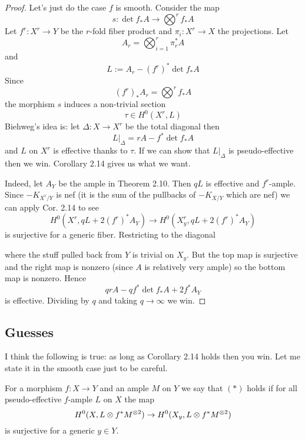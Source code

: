 \documentclass[12pt]{article}
\begin{document}
\begin{proof}
Let's just do the case $f$ is smooth. Consider the map
\[ s : \det{f_* A} \to \bigotimes^r f_* A \]
Let $f^r : X^r \to Y$ be the $r$-fold fiber product and $\pi_i : X^r \to X$ the projections. Let
\[ A_r = \bigotimes_{i = 1}^r \pi_r^* A \]
and 
\[ L := A_r - (f^r)^* \det{f_* A} \]
Since 
\[ (f^r)_* A_r = \bigotimes^r f_* A \]
the morphism $s$ induces a non-trivial section
\[ \tau \in H^0(X^r, L) \]
Biehweg's idea is: let $\Delta : X \to X^r$ be the total diagonal then
\[ L|_\Delta = r A - f^* \det{f_* A} \]
and $L$ on $X^r$ is effective thanks to $\tau$. If we can show that $L|_\Delta$ is pseudo-effective then we win. Corollary 2.14 gives us what we want.
\par 
Indeed, let $A_Y$ be the ample in Theorem 2.10. Then  $qL$ is effective and $f^r$-ample. Since $-K_{X^r/Y}$ is nef (it is the sum of the pullbacks of $-K_{X/Y}$ which are nef) we can apply Cor. 2.14 to see 
\[ H^0(X^r, q L + 2 (f^r)^* A_Y) \to H^0(X_y^r, q L + 2 (f^r)^* A_Y) \]
is surjective for a generic fiber. Restricting to the diagonal
\begin{center}
\end{center}
where the stuff pulled back from $Y$ is trivial on $X_y$. But the top map is surjective and the right map is nonzero (since $A$ is relatively very ample) so the bottom map is nonzero. Hence
\[ qr A - q f^* \det{f_* A} + 2 f^* A_Y \]
is effective. Dividing by $q$ and taking $q \to \infty$ we win. 
\end{proof}

\subsection{Guesses}

I think the following is true: as long as Corollary 2.14 holds then you win. Let me state it in the smooth case just to be careful.

\begin{defn}
For a morphism $f : X \to Y$ and an ample $M$ on $Y$ we say that $(\ast)$ holds if for all pseudo-effective $f$-ample $L$ on $X$ the map
\[ H^0(X, L \otimes f^* M^{\otimes 2}) \to H^0(X_y, L \otimes f^* M^{\otimes 2}) \]
is surjective for a generic $y \in Y$.
\end{defn}
\end{document}
